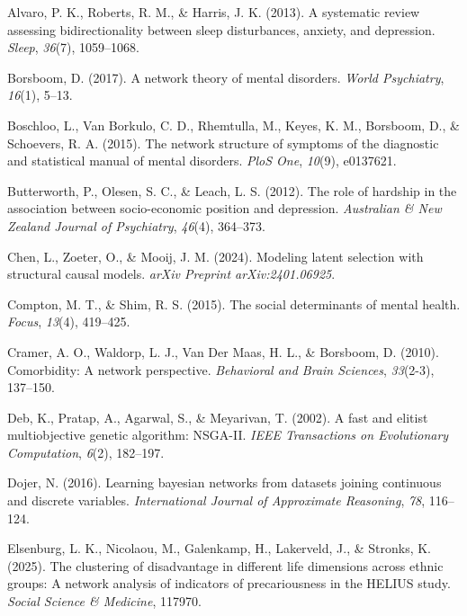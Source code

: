 \documentclass[
]{article}
\newlength{\cslhangindent}
\newenvironment{CSLReferences}[2] %
 {\begin{list}{}{%
  \setlength{\itemindent}{0pt}
  \setlength{\leftmargin}{0pt}
  \setlength{\parsep}{0pt}
  \ifodd #1
   \setlength{\leftmargin}{\cslhangindent}
   \setlength{\itemindent}{-1\cslhangindent}
  \fi
  \setlength{\itemsep}{#2\baselineskip}}}
 {\end{list}}
\begin{document}
\label{refs}
\begin{CSLReferences}{1}{0}
Alvaro, P. K., Roberts, R. M., \& Harris, J. K. (2013). A systematic
review assessing bidirectionality between sleep disturbances, anxiety,
and depression. \emph{Sleep}, \emph{36}(7), 1059--1068.

Borsboom, D. (2017). A network theory of mental disorders. \emph{World
Psychiatry}, \emph{16}(1), 5--13.

Boschloo, L., Van Borkulo, C. D., Rhemtulla, M., Keyes, K. M., Borsboom,
D., \& Schoevers, R. A. (2015). The network structure of symptoms of the
diagnostic and statistical manual of mental disorders. \emph{PloS One},
\emph{10}(9), e0137621.

Butterworth, P., Olesen, S. C., \& Leach, L. S. (2012). The role of
hardship in the association between socio-economic position and
depression. \emph{Australian \& New Zealand Journal of Psychiatry},
\emph{46}(4), 364--373.

Chen, L., Zoeter, O., \& Mooij, J. M. (2024). Modeling latent selection
with structural causal models. \emph{arXiv Preprint arXiv:2401.06925}.

Compton, M. T., \& Shim, R. S. (2015). The social determinants of mental
health. \emph{Focus}, \emph{13}(4), 419--425.

Cramer, A. O., Waldorp, L. J., Van Der Maas, H. L., \& Borsboom, D.
(2010). Comorbidity: A network perspective. \emph{Behavioral and Brain
Sciences}, \emph{33}(2-3), 137--150.

Deb, K., Pratap, A., Agarwal, S., \& Meyarivan, T. (2002). A fast and
elitist multiobjective genetic algorithm: NSGA-II. \emph{IEEE
Transactions on Evolutionary Computation}, \emph{6}(2), 182--197.

Dojer, N. (2016). Learning bayesian networks from datasets joining
continuous and discrete variables. \emph{International Journal of
Approximate Reasoning}, \emph{78}, 116--124.

Elsenburg, L. K., Nicolaou, M., Galenkamp, H., Lakerveld, J., \&
Stronks, K. (2025). The clustering of disadvantage in different life
dimensions across ethnic groups: A network analysis of indicators of
precariousness in the HELIUS study. \emph{Social Science \& Medicine},
117970.


\end{CSLReferences}
\end{document}
